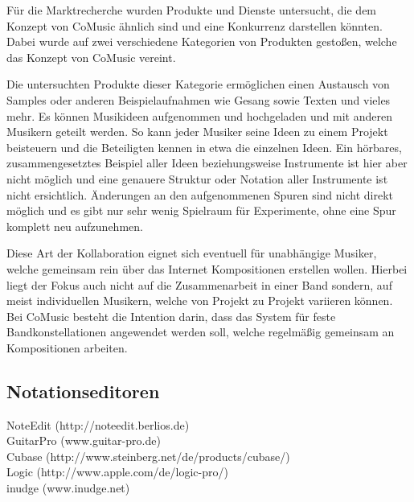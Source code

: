 \documentclass[12pt]{scrartcl}
\begin{document}
\parskip 24pt


Für die Marktrecherche wurden Produkte und Dienste untersucht, die dem Konzept von CoMusic ähnlich sind und eine Konkurrenz darstellen könnten. Dabei wurde auf zwei verschiedene Kategorien von Produkten gestoßen, welche das Konzept von CoMusic vereint.



Die untersuchten Produkte dieser Kategorie ermöglichen einen Austausch von Samples oder anderen Beispielaufnahmen wie Gesang sowie Texten und vieles mehr. Es können Musikideen aufgenommen und hochgeladen und mit anderen Musikern geteilt werden. So kann jeder Musiker seine Ideen zu einem Projekt beisteuern und die Beteiligten kennen in etwa die einzelnen Ideen. Ein hörbares, zusammengesetztes Beispiel aller Ideen beziehungsweise Instrumente ist hier aber nicht möglich und eine genauere Struktur oder Notation aller Instrumente ist nicht ersichtlich. Änderungen an den aufgenommenen Spuren sind nicht direkt möglich und es gibt nur sehr wenig Spielraum für Experimente, ohne eine Spur komplett neu aufzunehmen.

Diese Art der Kollaboration eignet sich eventuell für unabhängige Musiker, welche gemeinsam rein über das Internet Kompositionen erstellen wollen. Hierbei liegt der Fokus auch nicht auf die Zusammenarbeit in einer Band sondern, auf meist individuellen Musikern, welche von Projekt zu Projekt variieren können. Bei CoMusic besteht die Intention darin, dass das System für feste Bandkonstellationen angewendet werden soll, welche regelmäßig gemeinsam an Kompositionen arbeiten.






\subsection{Notationseditoren}

\begin{description}
\item[NoteEdit (http://noteedit.berlios.de)]
\item[GuitarPro (www.guitar-pro.de)]
\item[Cubase (http://www.steinberg.net/de/products/cubase/)]
\item[Logic (http://www.apple.com/de/logic-pro/)]
\item[inudge (www.inudge.net)]
\end{description}
\end{document}

